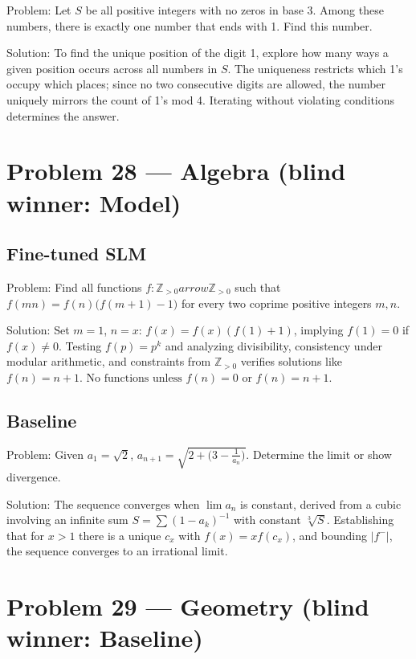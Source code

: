 \documentclass[11pt]{article}
\begin{document}
Problem:
Let $S$ be all positive integers with no zeros in base 3. Among these numbers, there is exactly one number that ends with 1. Find this number.

Solution:
To find the unique position of the digit 1, explore how many ways a given position occurs across all numbers in $S$. The uniqueness restricts which 1's occupy which places; since no two consecutive digits are allowed, the number uniquely mirrors the count of 1's mod 4. Iterating without violating conditions determines the answer.

\section*{Problem 28 --- Algebra \quad(blind winner: Model)}

\subsection*{Fine-tuned SLM}

Problem:
Find all functions $f : \mathbb{Z}_{>0} arrow \mathbb{Z}_{>0}$ such that $f(mn) = f(n)\big(f(m+1)-1\big)$ for every two coprime positive integers $m,n$.

Solution:
Set $m=1$, $n=x$: $f(x)=f(x)(f(1)+1)$, implying $f(1)=0$ if $f(x)\ne0$. Testing $f(p)=p^k$ and analyzing divisibility, consistency under modular arithmetic, and constraints from $\mathbb Z_{>0}$ verifies solutions like $f(n)=n+1$. $\boxed{\text{No functions unless } f(n)=0 \text{ or } f(n)=n+1.}$

\subsection*{Baseline}

Problem:
Given $a_1=\sqrt2$, $a_{n+1}=\sqrt{2+\big(3-\frac1{a_n}\big)}$. Determine the limit or show divergence.

Solution:
The sequence converges when $\lim a_n$ is constant, derived from a cubic involving an infinite sum $S=\sum(1-a_k)^{-1}$ with constant $\sqrt[3]{S}$. Establishing that for $x>1$ there is a unique $c_x$ with $f(x)=x f(c_x)$, and bounding $|f^-|$, the sequence converges to an irrational limit.

\section*{Problem 29 --- Geometry \quad(blind winner: Baseline)}
\end{document}
